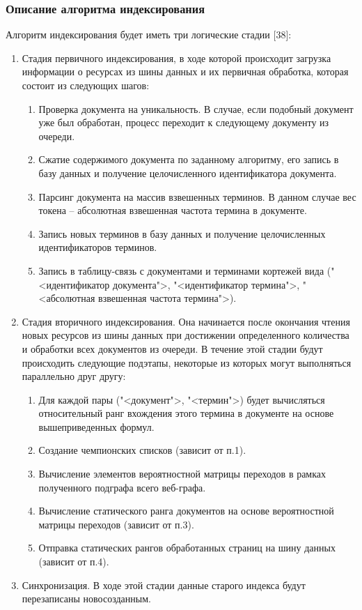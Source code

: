 \subsubsection{Описание алгоритма индексирования}

Алгоритм индексирования будет иметь три логические стадии [38]:
\begin{enumerate}
\item Стадия первичного индексирования, в ходе которой происходит загрузка информации о ресурсах из шины данных и их первичная обработка, которая состоит из следующих шагов:
\begin{enumerate}
\item Проверка документа на уникальность. В случае, если подобный документ уже был обработан, процесс переходит к следующему документу из очереди.
\item Сжатие содержимого документа по заданному алгоритму, его запись в базу данных и получение целочисленного идентификатора документа.
\item Парсинг документа на массив взвешенных терминов. В данном случае вес токена -- абсолютная взвешенная частота термина в документе.
\item Запись новых терминов в базу данных и получение целочисленных идентификаторов терминов.
\item Запись в таблицу-связь с документами и терминами кортежей вида ("<идентификатор документа">, "<идентификатор термина">, "<абсолютная взвешенная частота термина">).
\end{enumerate}
\item Стадия вторичного индексирования. Она начинается после окончания чтения новых ресурсов из шины данных при достижении определенного количества и обработки всех документов из очереди. В течение этой стадии будут происходить следующие подэтапы, некоторые из которых могут выполняться параллельно друг другу:
\begin{enumerate}
\item Для каждой пары ("<документ">, "<термин">) будет вычисляться относительный ранг вхождения этого термина в документе на основе вышеприведенных формул.
\item Создание чемпионских списков (зависит от п.1).
\item Вычисление элементов вероятностной матрицы переходов в рамках полученного подграфа всего веб-графа.
\item Вычисление статического ранга документов на основе вероятностной матрицы переходов (зависит от п.3).
\item Отправка статических рангов обработанных страниц на шину данных (зависит от п.4).
\end{enumerate}
\item Синхронизация. В ходе этой стадии данные старого индекса будут перезаписаны новосозданным.
\end{enumerate}

